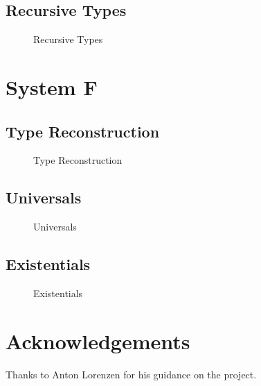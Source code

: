 \documentclass[nonacm]{acmart}
\begin{document}
\subsection{Recursive Types}

\begin{figure}
  \begin{framed}
  \end{framed}
  \caption{Recursive Types}\label{fig:recursive-types}
\end{figure}

\section{System F}

\subsection{Type Reconstruction}

\begin{figure}
  \begin{framed}
  \end{framed}
  \caption{Type Reconstruction}\label{fig:type-reconstruction}
\end{figure}

\subsection{Universals}

\begin{figure}
  \begin{framed}
  \end{framed}
  \caption{Universals}\label{fig:universals}
\end{figure}

\subsection{Existentials}

\begin{figure}
  \begin{framed}
  \end{framed}
  \caption{Existentials}\label{fig:existentials}
\end{figure}

\section{Acknowledgements}

Thanks to Anton Lorenzen for his guidance on the project.
\end{document}
